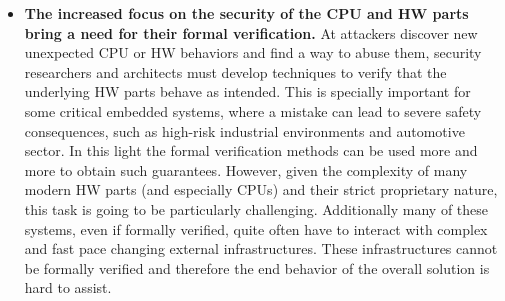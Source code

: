 \begin{itemize}
		\item \textbf{The increased focus on the security of the CPU and HW parts bring a need for their formal verification.} At attackers discover new unexpected CPU or HW behaviors and find a way to abuse them, security researchers and architects must develop techniques to verify that the underlying HW parts behave as intended. This is specially important for some critical embedded systems, where a mistake can lead to severe safety consequences, such as high-risk industrial environments and automotive sector. In this light the formal verification methods can be used more and more to obtain such guarantees. However, given the complexity of many modern HW parts (and especially CPUs) and their strict proprietary nature, this task is going to be particularly challenging. Additionally many of these systems, even if formally verified, quite often have to interact with complex and fast pace changing external infrastructures. These infrastructures cannot be formally verified and therefore the end behavior of the overall solution is hard to assist.  	
		\end{itemize}
		
		
